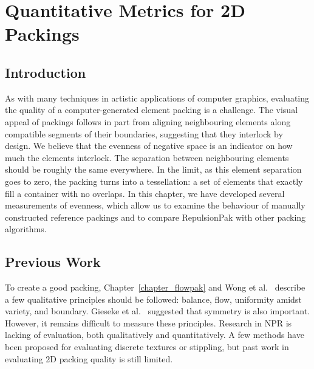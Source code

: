 
\chapter{Quantitative Metrics for 2D Packings}
\label{chapter_qualitative_metrics}


\section{Introduction}


\newtext
{
As with many techniques in artistic applications of computer graphics, evaluating the
quality of a computer-generated element packing is a challenge.
The visual appeal of packings follows in part from aligning neighbouring elements along compatible 
segments of their boundaries, suggesting that they interlock by design. 
We believe that the evenness of negative space is an indicator 
on how much the elements interlock.
The separation between neighbouring elements should be roughly the same everywhere.
In the limit, as this element separation goes to zero,
the packing turns into a tessellation: a set of elements that exactly
fill a container with no overlaps.  
In this chapter, we have developed several measurements of evenness,
which allow us to examine the behaviour of manually constructed reference
packings and to compare RepulsionPak with other packing algorithms.
}

\section{Previous Work}


\newtext
{
To create a good packing, Chapter~\ref{chapter_flowpak} and Wong et al.~\cite{Wong1998} describe
a few qualitative principles should be followed: balance, flow, uniformity amidst variety, and boundary.
Gieseke et al.~\cite{Gieseke2017} suggested that symmetry is also important.
However, it remains difficult to measure these principles.
Research in NPR is lacking of evaluation, both qualitatively and quantitatively.
A few methods have been proposed for evaluating discrete textures or stippling,
but past work in evaluating 2D packing quality is still limited.
}

